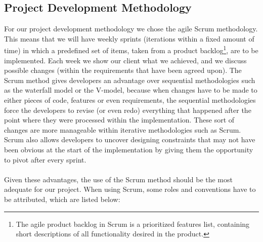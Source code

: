 \subsection{Project Development Methodology} %

For our project development methodology we chose the agile Scrum methodology. This means that we will have weekly sprints (iterations within a fixed amount of time) in which a predefined set of items, taken from a product backlog\footnote{The agile product backlog in Scrum is a prioritized features list, containing short descriptions of all functionality desired in the product.\cite{backlog} }, are to be implemented. Each week we show our client what we achieved, and we discuss possible changes (within the requirements that have been agreed upon). The Scrum method gives developers an advantage over sequential methodologies such as the waterfall model or the V-model, because when changes have to be made to either pieces of code, features or even requirements, the sequential methodologies force the developers to revise (or even redo) everything that happened after the point where they were processed within the implementation. These sort of changes are more manageable within iterative methodologies such as Scrum. Scrum also allows developers to uncover designing constraints that may not have been obvious at the start of the implementation by giving them the opportunity to pivot after every sprint. \\\\
Given these advantages, the use of the Scrum method should be the most adequate for our project. When using Scrum, some roles and conventions have to be attributed, which are listed below:

